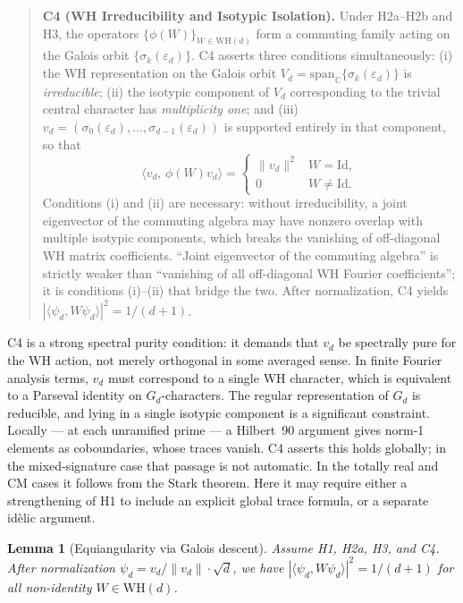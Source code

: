 \documentclass[12pt]{article}
\theoremstyle{plain}
\newtheorem{lemmainner}[theoreminner]{Lemma}
\theoremstyle{definition}
\theoremstyle{remark}
\newenvironment{lemma}{\begin{mdframed}[style=thmstyle]\begin{lemmainner}}{\end{lemmainner}\end{mdframed}}
\newcommand{\WH}{\mathrm{WH}}
\newcommand{\eps}{\varepsilon}
\newcommand{\bC}{\mathbb{C}}
\begin{document}
\begin{quote}
\textbf{C4 (WH Irreducibility and Isotypic Isolation).} Under H2a--H2b and H3, the operators $\{\phi(W)\}_{W \in \WH(d)}$ form a commuting family acting on the Galois orbit $\{\sigma_k(\eps_d)\}$. C4 asserts three conditions simultaneously: (i) the WH representation on the Galois orbit $V_d = \mathrm{span}_\bC\{\sigma_k(\eps_d)\}$ is \emph{irreducible}; (ii) the isotypic component of $V_d$ corresponding to the trivial central character has \emph{multiplicity one}; and (iii) $v_d = (\sigma_0(\eps_d), \ldots, \sigma_{d-1}(\eps_d))$ is supported entirely in that component, so that
\[
  \langle v_d,\, \phi(W) v_d \rangle = \begin{cases} \|v_d\|^2 & W = \mathrm{Id}, \\ 0 & W \neq \mathrm{Id}. \end{cases}
\]
Conditions (i) and (ii) are necessary: without irreducibility, a joint eigenvector of the commuting algebra may have nonzero overlap with multiple isotypic components, which breaks the vanishing of off-diagonal WH matrix coefficients. ``Joint eigenvector of the commuting algebra'' is strictly weaker than ``vanishing of all off-diagonal WH Fourier coefficients''; it is conditions (i)--(ii) that bridge the two. After normalization, C4 yields $|\langle \psi_d, W\psi_d\rangle|^2 = 1/(d+1)$.

\end{quote}

C4 is a strong spectral purity condition: it demands that $v_d$ be spectrally pure for the WH action, not merely orthogonal in some averaged sense. In finite Fourier analysis terms, $v_d$ must correspond to a single WH character, which is equivalent to a Parseval identity on $G_d$-characters. The regular representation of $G_d$ is reducible, and lying in a single isotypic component is a significant constraint. Locally — at each unramified prime — a Hilbert~90 argument gives norm-1 elements as coboundaries, whose traces vanish. C4 asserts this holds globally; in the mixed-signature case that passage is not automatic. In the totally real and CM cases it follows from the Stark theorem. Here it may require either a strengthening of H1 to include an explicit global trace formula, or a separate id\`{e}lic argument.

\begin{lemma}[Equiangularity via Galois descent]
  \label{lem:equiangular}
  Assume H1, H2a, H3, and C4. After normalization $\psi_d = v_d / \|v_d\| \cdot \sqrt{d}$, we have $|\langle \psi_d, W\psi_d \rangle|^2 = 1/(d+1)$ for all non-identity $W \in \WH(d)$.
\end{lemma}
\end{document}
